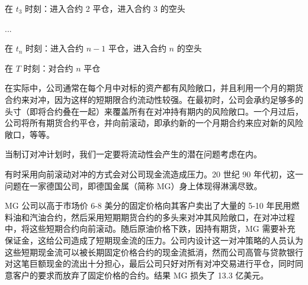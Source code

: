 在 $t_3$ 时刻：进入合约 2 平仓，进入合约 3 的空头

...

在 $t_n$ 时刻：进入合约 $n-1$ 平仓，进入合约 $n$ 的空头

在 $T$ 时刻：对合约 $n$ 平仓

在实际中，公司通常在每个月中对标的资产都有风险敞口，并且利用一个月的期货合约来对冲，因为这样的短期限合约流动性较强。在最初时，公司会承约足够多的头寸（即将合约叠在一起）来覆盖所有在对冲持有期内的风险敞口。一个月过后，公司将所有期货合约平仓，并向前滚动，即承约新的一个月期合约来应对新的风险敞口，等等。

当制订对冲计划时，我们一定要将流动性会产生的潜在问题考虑在内。
\begin{tcolorbox}[title=业界事例：德国金属公司对冲的失误]
    有时采用向前滚动对冲的方式会对公司现金流造成压力。20 世纪 90 年代初，这一问题在一家德国公司，即德国金属（简称 MG）身上体现得淋漓尽致。

    MG 公司以高于市场价 6-8 美分的固定价格向其客户卖出了大量的 5-10 年民用燃料油和汽油合约，然后采用短期期货合约的多头来对冲其风险敞口，在对冲过程中，将这些短期合约向前滚动。随后原油价格下跌，因持有期货，MG 需要补充保证金，这给公司造成了短期现金流的压力。公司内设计这一对冲策略的人员认为这些短期现金流可以被长期固定价格合约的现金流抵消，然而公司高管与贷款银行对这笔巨额现金的流出十分担心，最后公司只好对所有对冲交易进行平仓，同时同意客户的要求而放弃了固定价格的合约。结果 MG 损失了 13.3 亿美元。
\end{tcolorbox}